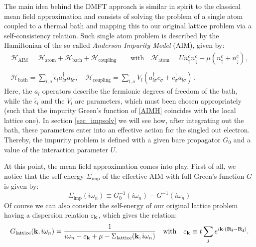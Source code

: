 The main idea behind the DMFT approach is similar in spirit to the classical mean field approximation and consists of solving the problem of a single atom coupled to a thermal bath and mapping this to our original lattice problem via a self-consistency relation.
Such single atom problem is described by the Hamiltonian of the so called \emph{Anderson Impurity Model} (AIM), given by:
%
\begin{equation}\label{AIMH}
\begin{array}{c}
\mathcal{H}_{\text{AIM}} = \mathcal{H}_{\text{atom}} + \mathcal{H}_{\text{bath}} + \mathcal{H}_{\text{coupling}}
\quad \quad
\text{with}
\quad
\mathcal{H}_{\text{atom}} = Un_\uparrow^cn_\downarrow^c - \mu (n_\uparrow^c+n_\downarrow^c),
\\ 
\\ 
\mathcal{H}_{\text{bath}} = \sum_{l,\sigma}\tilde{\epsilon}_la_{l\sigma}^\dagger a_{l\sigma},
\quad
\mathcal{H}_{\text{coupling}} = \sum_{l,\sigma}V_l(a_{l\sigma}^\dagger c_{\sigma} + c_{\sigma}^\dagger a_{l\sigma})
\, .
\end{array}
\end{equation}
%
Here, the $a_l$ operators describe the fermionic degrees of freedom of the bath, while the $\tilde{\epsilon_l}$ and the $V_l$ are parameters, which must been chosen appropriately (such that the impurity Green's function of \eqref{AIMH} coincides with the local lattice one). In section \ref{sec_impsolv} we will see how, after integrating out the bath, these parameters enter into an effective action for the singled out electron. Thereby, the impurity problem is defined with a given bare propagator $G_0$ and a value of the interaction parameter $U$.

At this point, the mean field approximation comes into play. First of all, we notice that the self-energy $\Sigma_\mathrm{imp}$ of the effective AIM with full Green's function $G$ is given by:
%
\begin{equation}\label{s_imp}
\Sigma_{\text{imp}}(i\omega_n) \equiv G_0^{-1}(i\omega_n) - G^{-1}(i\omega_n)
\end{equation}
%
Of course we can also consider the self-energy of our original lattice problem having a dispersion relation $\varepsilon_{\bold{k}}$, which gives the relation:
%
\begin{equation} \label{not_summed_over}
G_{\text{lattice}}(\bold{k},i\omega_n) = \frac{1}{i\omega_n - \varepsilon_{\bold{k}} + \mu -\Sigma_{\text{lattice}}(\bold{k},i\omega_n)}
\quad \text{with}
\quad
\varepsilon_\bold{k} \equiv t \sum_j e^{i\bold{k} \cdot ( \bold{R_i} - \bold{R_j} )}
.
\end{equation}



